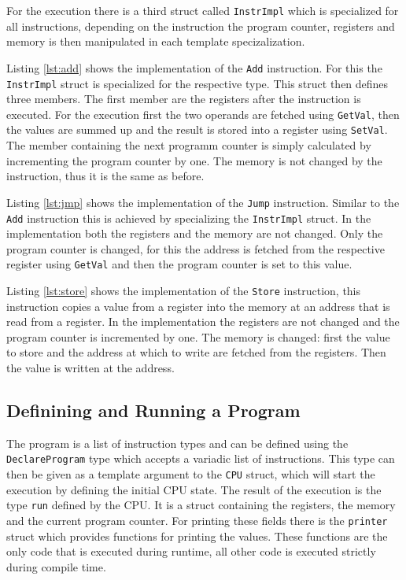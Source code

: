 For the execution there is a third struct called \lstinline{InstrImpl} which is
specialized for all instructions, depending on the instruction the program counter,
registers and memory is then manipulated in each template specizalization.

Listing \ref{lst:add} shows the implementation of the \lstinline{Add} instruction.
For this the \lstinline{InstrImpl} struct is specialized for the respective type.
This struct then defines three members. The first member are the registers after the
instruction is executed. For the execution first the two operands are fetched using
\lstinline{GetVal}, then the values are summed up and the result is stored into a
register using \lstinline{SetVal}. The member containing the next programm counter
is simply calculated by incrementing the program counter by one. The memory is not
changed by the instruction, thus it is the same as before.



Listing \ref{lst:jmp} shows the implementation of the \lstinline{Jump} instruction.
Similar to the \lstinline{Add} instruction this is achieved by specializing the 
\lstinline{InstrImpl} struct. In the implementation both the registers and the memory
are not changed. Only the program counter is changed, for this the address is fetched
from the respective register using \lstinline{GetVal} and then the program counter is
set to this value.



Listing \ref{lst:store} shows the implementation of the \lstinline{Store} instruction,
this instruction copies a value from a register into the memory at an address that is
read from a register.
In the implementation the registers are not changed and the program counter is incremented
by one. The memory is changed: first the value to store and the address at which to write
are fetched from the registers. Then the value is written at the address.



\subsection{Definining and Running a Program}
The program is a list of instruction types and can be defined using the 
\lstinline{DeclareProgram} type which accepts a variadic list of instructions. 
This type can then be given as a template argument to the \lstinline{CPU} struct, which will start the execution by defining
the initial CPU state. The result of the execution is the type \lstinline{run} defined
by the CPU. It is a struct containing the registers, the memory and the current program
counter. For printing these fields there is the \lstinline{printer} struct which
provides functions for printing the values. These functions are the only code that is
executed during runtime, all other code is executed strictly during compile time.

